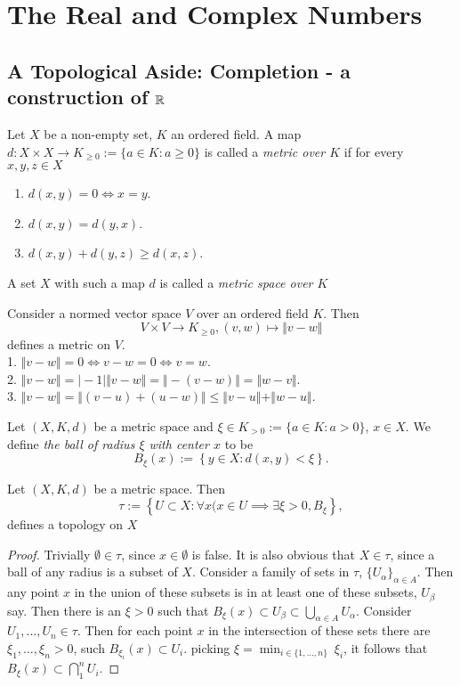\section{The Real and Complex Numbers}
\subsection{A Topological Aside: Completion - a construction of $\mathbb{R}$}
    \begin{definition}
        Let $X$ be a non-empty set, $K$ an ordered field. A map $d:X\times X\rightarrow K_{\geq 0}:=\{ a\in K: a\geq 0\}$ is called a \textit{metric over $K$} if for every $x,y,z\in X$
        \begin{enumerate}
            \item $d(x,y)=0 \iff x=y$.
            \item $d(x,y)=d(y,x)$.
            \item $d(x,y)+d(y,z)\geq d(x,z)$.
        \end{enumerate}
        A set $X$ with such a map $d$ is called a \textit{metric space over $K$}
    \end{definition}
    \begin{remark}
        Consider a normed vector space $V$ over an ordered field $K$. Then $$V\times V\rightarrow K_{\geq0}, (v,w)\mapsto \Vert v-w\Vert$$ 
        defines a metric on $V$.\\ 
        1. $\Vert v-w\Vert =0 \iff v-w=0\iff v=w$.\\
        2. $\Vert v-w\Vert = \vert -1\vert \Vert v-w \Vert = \Vert -(v-w)\Vert = \Vert w-v\Vert.$\\
        3. $\Vert v-w\Vert = \Vert (v-u)+(u-w)\Vert\leq \Vert v-u\Vert +\Vert w-u\Vert.$
    \end{remark}
    \begin{definition}
        Let $(X,K,d)$ be a metric space and $\xi \in K_{>0}:=\{ a\in K:a>0\}$, $x\in X$. We define \textit{the ball of radius $\xi$ with center $x$} to be
        $$B_\xi(x):= \left\{ y\in X: d(x,y)<\xi\right\}.$$
    \end{definition}
    \begin{lemma}
        Let $(X,K,d)$ be a metric space. Then
        $$\tau := \left\{U\subset X : \forall x(x\in U \implies \exists \xi >0, B_\xi\right\},$$
        defines a topology on $X$
    \end{lemma}
    \begin{proof}
        Trivially $\emptyset\in \tau$, since $x\in \emptyset$ is false. It is also obvious that $X\in \tau$, since a ball of any radius is a subset of $X$. Consider a family of sets in $\tau$, $\{U_\alpha\}_{\alpha \in A}$. Then any point $x$ in the union of these subsets is in at least one of these subsets, $U_\beta$ say. Then there is an $\xi>0$ such that $B_\xi(x)\subset U_\beta \subset\bigcup_{\alpha\in A} U_\alpha$. Consider $U_1,\dots,U_n\in \tau$. Then for each point $x$ in the intersection of these sets there are $\xi_1,\dots,\xi_n>0$, such $B_{\xi_i}(x)\subset U_i$. picking $\xi=\min_{i\in\{1,\dots,n\}} \ \xi_i$, it follows that $B_\xi(x)\subset \bigcap_1^n U_i$.
    \end{proof}
